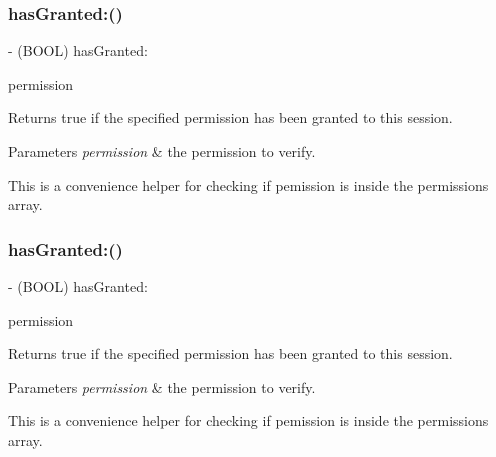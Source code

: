 \subsubsection{\texorpdfstring{has\+Granted\+:()}{hasGranted:()}\hspace{0.1cm}{\footnotesize\ttfamily [4/5]}}
{\footnotesize\ttfamily -\/ (B\+O\+OL) has\+Granted\+: \begin{DoxyParamCaption}\item[{(N\+S\+String $\ast$)}]{permission }\end{DoxyParamCaption}}

Returns true if the specified permission has been granted to this session.


\begin{DoxyParams}{Parameters}
{\em permission} & the permission to verify.\\
\hline
\end{DoxyParams}
This is a convenience helper for checking if {\ttfamily pemission} is inside the permissions array. \mbox{\label{interfaceFBSession_aa74d6239fcde1f9d6dd9530538eb691b}} 
\subsubsection{\texorpdfstring{has\+Granted\+:()}{hasGranted:()}\hspace{0.1cm}{\footnotesize\ttfamily [5/5]}}
{\footnotesize\ttfamily -\/ (B\+O\+OL) has\+Granted\+: \begin{DoxyParamCaption}\item[{(N\+S\+String $\ast$)}]{permission }\end{DoxyParamCaption}}

Returns true if the specified permission has been granted to this session.


\begin{DoxyParams}{Parameters}
{\em permission} & the permission to verify.\\
\hline
\end{DoxyParams}
This is a convenience helper for checking if {\ttfamily pemission} is inside the permissions array. \mbox{\label{interfaceFBSession_ac5ec026f515c232cd4498cf2bc4022b4}} 
